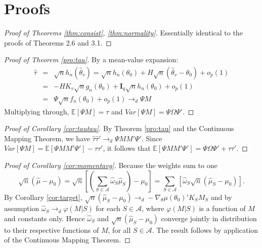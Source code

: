 \documentclass[12pt]{article}
\newcommand{\expect}{\mathbb{E}}
\theoremstyle{definition}
\begin{document}






\appendix



\section{Proofs}



\begin{proof}[Proof of Theorems \ref{thm:consist}, \ref{thm:normality}]
Essentially identical to the proofs of \cite{NeweyMcFadden1994} Theorems 2.6 and 3.1.
\end{proof}



\begin{proof}[Proof of Theorem \ref{pro:tau}]
By a mean-value expansion:
	\begin{eqnarray*}
	\widehat{\tau} &=& \sqrt{n} h_n\left(\widehat{\theta}_{v}\right) = \sqrt{n}h_n(\theta_0) + H \sqrt{n}\left(\widehat{\theta}_{v} - \theta_0\right) + o_p(1)\\
		&=&-HK_{v} \sqrt{n}g_n(\theta_0) + \mathbf{I}_q\sqrt{n}h_n(\theta_0) +o_p(1)\\
		&=& \Psi \sqrt{n}f_n(\theta_0) + o_p(1) \rightarrow_d\Psi M
\end{eqnarray*}
Multiplying through, $\expect\left[\Psi M\right] = \tau$ and $Var\left[\Psi M\right] = \Psi \Omega \Psi'$.
\end{proof}




\begin{proof}[Proof of Corollary \ref{cor:tautau}]
By Theorem \ref{pro:tau} and the Continuous Mapping Theorem, we have $\widehat{\tau}\widehat{\tau}' \rightarrow_d\Psi MM'\Psi'$. Since $ Var[\Psi M] = \expect[\Psi MM' \Psi'] - \tau \tau'$, it follows that
$\expect[\Psi MM' \Psi']  =\Psi \Omega \Psi'  + \tau \tau'$. 
\end{proof}



\begin{proof}[Proof of Corollary \ref{cor:momentavg}]
Because the weights sum to one
		$$\sqrt{n}\left(\widehat{\mu} - \mu_0\right) = \sqrt{n} \left[\left(\sum_{S \in \mathcal{A}} \widehat{\omega}_S \widehat{\mu}_S\right) - \mu_0\right]= \sum_{S \in \mathcal{A}}\left[ \widehat{\omega}_S \sqrt{n}\left(\widehat{\mu}_S - \mu_0\right)\right].$$
By Corollary \ref{cor:target}, $\sqrt{n}\left(\widehat{\mu}_S - \mu_0\right)\rightarrow_d-\nabla_\theta\mu(\theta_0)'K_S M_S$ and by assumption $\widehat{\omega}_S \rightarrow_d\varphi(M|S)$ for each $S\in \mathcal{A}$, where $\varphi(M|S)$ is a function of $M$ and constants only. Hence $\widehat{\omega}_S$ and $\sqrt{n}\left(\widehat{\mu}_S - \mu_0\right)$ converge jointly in distribution to their respective functions of $M$, for all $S \in \mathcal{A}$. The result follows by application of the Continuous Mapping Theorem.
\end{proof}
\end{document}
